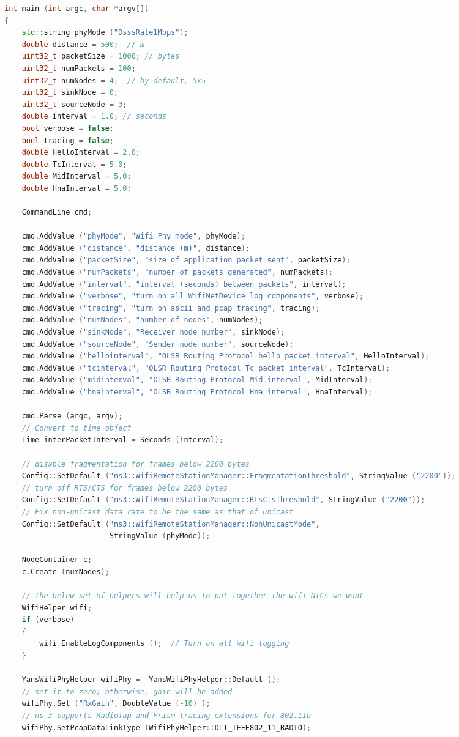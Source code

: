 \documentclass[a4paper,12pt]{report}
\begin{document}
\begin{appendix}
\begin{spacing}{1.5}
\begin{lstlisting}[language=c++]
int main (int argc, char *argv[])
{
	std::string phyMode ("DsssRate1Mbps");
	double distance = 500;  // m
	uint32_t packetSize = 1000; // bytes
	uint32_t numPackets = 100;
	uint32_t numNodes = 4;  // by default, 5x5
	uint32_t sinkNode = 0;
	uint32_t sourceNode = 3;
	double interval = 1.0; // seconds
	bool verbose = false;
	bool tracing = false;
	double HelloInterval = 2.0;
	double TcInterval = 5.0;
	double MidInterval = 5.0;
	double HnaInterval = 5.0;

	CommandLine cmd;

	cmd.AddValue ("phyMode", "Wifi Phy mode", phyMode);
	cmd.AddValue ("distance", "distance (m)", distance);
	cmd.AddValue ("packetSize", "size of application packet sent", packetSize);
	cmd.AddValue ("numPackets", "number of packets generated", numPackets);
	cmd.AddValue ("interval", "interval (seconds) between packets", interval);
	cmd.AddValue ("verbose", "turn on all WifiNetDevice log components", verbose);
	cmd.AddValue ("tracing", "turn on ascii and pcap tracing", tracing);
	cmd.AddValue ("numNodes", "number of nodes", numNodes);
	cmd.AddValue ("sinkNode", "Receiver node number", sinkNode);
	cmd.AddValue ("sourceNode", "Sender node number", sourceNode);
	cmd.AddValue ("hellointerval", "OLSR Routing Protocol hello packet interval", HelloInterval);
	cmd.AddValue ("tcinterval", "OLSR Routing Protocol Tc packet interval", TcInterval);
	cmd.AddValue ("midinterval", "OLSR Routing Protocol Mid interval", MidInterval);
	cmd.AddValue ("hnainterval", "OLSR Routing Protocol Hna interval", HnaInterval);

	cmd.Parse (argc, argv);
	// Convert to time object
	Time interPacketInterval = Seconds (interval);

	// disable fragmentation for frames below 2200 bytes
	Config::SetDefault ("ns3::WifiRemoteStationManager::FragmentationThreshold", StringValue ("2200"));
	// turn off RTS/CTS for frames below 2200 bytes
	Config::SetDefault ("ns3::WifiRemoteStationManager::RtsCtsThreshold", StringValue ("2200"));
	// Fix non-unicast data rate to be the same as that of unicast
	Config::SetDefault ("ns3::WifiRemoteStationManager::NonUnicastMode",
						StringValue (phyMode));

	NodeContainer c;
	c.Create (numNodes);

	// The below set of helpers will help us to put together the wifi NICs we want
	WifiHelper wifi;
	if (verbose)
	{
		wifi.EnableLogComponents ();  // Turn on all Wifi logging
	}

	YansWifiPhyHelper wifiPhy =  YansWifiPhyHelper::Default ();
	// set it to zero; otherwise, gain will be added
	wifiPhy.Set ("RxGain", DoubleValue (-10) );
	// ns-3 supports RadioTap and Prism tracing extensions for 802.11b
	wifiPhy.SetPcapDataLinkType (WifiPhyHelper::DLT_IEEE802_11_RADIO);


\end{lstlisting}
\end{spacing}
\end{appendix}
\end{document}
